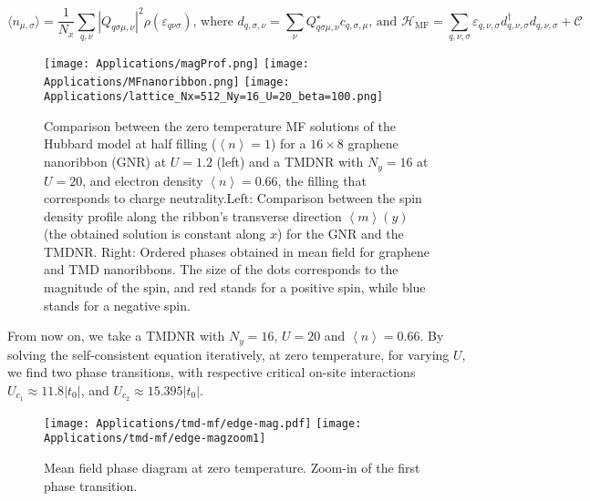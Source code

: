\begin{equation}
\big\langle n_{\mu, \sigma} \big\rangle = \frac{1}{N_x}\sum_{q, \nu} | Q_{q \sigma \mu, \nu} |^2 \rho ( \varepsilon_{q \nu \sigma} ) , \, \text{where} \,\, d_{q, \sigma, \nu} = \sum_\nu Q_{q \sigma \mu, \nu}^\star c_{q ,\sigma, \mu} ,  \, \text{and} \,\, \mathcal{H}_{\text{MF}} = \sum_{q, \nu, \sigma} \varepsilon_{q, \nu, \sigma} d_{q, \nu, \sigma}^\dagger d_{q, \nu, \sigma} + \mathcal{C}
\end{equation}
\begin{figure}[H]
\texttt{[image: Applications/magProf.png]}
\hspace{0.9cm}
\texttt{[image: Applications/MFnanoribbon.png]}
\texttt{[image: Applications/lattice\_Nx=512\_Ny=16\_U=20\_beta=100.png]}
	\caption[Comparison between the zero temperature MF solutions of the Hubbard model for a graphene nanoribbon(GNR) and a \acs{TMDNR}]{Comparison between the zero temperature MF solutions of the Hubbard model at half filling ($\left\langle n \right\rangle = 1$) for a $16 \times 8$ graphene nanoribbon (GNR) at $U=1.2$ (left) and a \acs{TMDNR} with $N_y = 16$ at $U = 20$, and electron density $\left\langle n \right\rangle = 0.66$, the filling that corresponds to charge neutrality.Left: Comparison between the spin density profile along the ribbon's transverse direction $\left\langle m \right\rangle (y)$ (the obtained solution is constant along $x$) for the GNR and the \acs{TMDNR}.
Right: Ordered phases obtained in mean field for graphene and \ac{TMD} nanoribbons. 
The size of the dots corresponds to the magnitude of the spin, and red stands for a positive spin, while blue stands for a negative spin.}
	\label{fig:nanoGraphVsTMD}
\end{figure}
From now on, we take a \acs{TMDNR} with $N_y = 16$, $U = 20$ and $\left\langle n \right\rangle = 0.66$.
By solving the self-consistent equation iteratively, at zero temperature, for varying $U$, we find two phase transitions, with respective critical on-site interactions $U_{c_1} \approx 11.8 |t_0|$, and $U_{c_2} \approx 15.395 |t_0|$.
\begin{figure}[H]
\texttt{[image: Applications/tmd-mf/edge-mag.pdf]}
\hspace{0.5cm}
\texttt{[image: Applications/tmd-mf/edge-magzoom1]}
	\caption[Mean field phase diagram at zero temperature. Zoom-in of the first phase transition.]{Mean field phase diagram at zero temperature. Zoom-in of the first phase transition.
	\label{fig:zeroTphaseDiagram}}
\end{figure}
